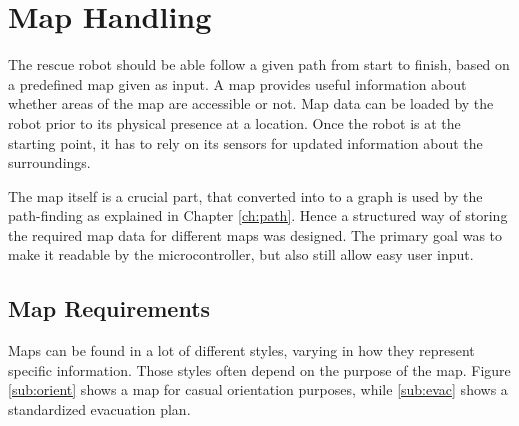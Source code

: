 


\chapter{Map Handling}
\label{ch:map_handling} %
The rescue robot should be able follow a given path from start to finish, based on a predefined map given as input.
A map provides useful information about whether areas of the map are accessible or not. 
Map data can be loaded by the robot prior to its physical presence at a location. 
Once the robot is at the starting point, it has to rely on its sensors for updated information about the surroundings. 

The map itself is a crucial part, that converted into to a graph is used by the path-finding as explained in Chapter \ref{ch:path}. 
Hence a structured way of storing the required map data for different maps was designed. 
The primary goal was to make it readable by the microcontroller, but also still allow easy user input.


\newpage
\section{Map Requirements}
\label{sec:map_requirements}
Maps can be found in a lot of different styles,
varying in how they represent specific information.
Those styles often depend on the purpose of the map.
Figure \ref{sub:orient} shows a map for casual orientation purposes,
while \ref{sub:evac} shows a standardized evacuation plan.

